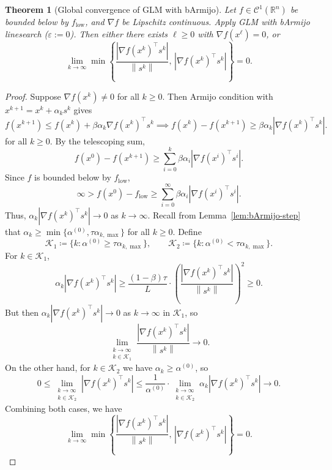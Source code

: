 \documentclass[11pt,a4paper]{report}
\theoremstyle{plain}
\newtheorem{theorem}{Theorem}[chapter]
\theoremstyle{definition}
\newcommand{\R}{\mathbb{R}}
\newcommand{\norm}[1]{\left\lVert#1\right\rVert}
\newcommand{\grad}{\nabla}
\newcommand{\trans}{^{\top}}
\newcommand{\eps}{\varepsilon}
\begin{document}
\begin{theorem}[Global convergence of GLM with bArmijo]\label{thm:GLM-global}
Let $f\in\mathcal{C}^{1}(\R^{n})$ be bounded below by $f_{\mathrm{low}}$, and
$\grad f$ be Lipschitz continuous. Apply GLM with bArmijo linesearch
($\eps:=0$). Then either there exists $\ell\ge 0$ with $\grad f(x^{\ell})=0$,
or
\[
\lim_{k\to\infty}\min\!\left\{\frac{|\grad f(x^{k})\trans s^{k}|}{\norm{s^{k}}},\,
   |\grad f(x^{k})\trans s^{k}|\right\}=0.
\]
\end{theorem}
\begin{proof}
  Suppose $\grad f(x^{k}) \neq 0$ for all $k \geq 0$. Then Armijo condition with $x^{k+1} = x^{k} + \alpha_{k} s^{k}$ gives
  \[
    f(x^{k+1}) \leq f(x^{k}) + \beta \alpha_{k} \grad f(x^{k})\trans s^{k} \implies f(x^{k}) - f(x^{k+1}) \geq \beta \alpha_{k} |\grad f(x^{k})\trans s^{k}|.
  \]
  for all $k \geq 0$. By the telescoping sum,
  \[
    f(x^{0}) - f(x^{k+1}) \geq \sum_{i = 0}^{k} \beta \alpha_{i} |\grad f(x^{i})\trans s^{i}|.
  \]
  Since $f$ is bounded below by $f_{\mathrm{low}}$, 
  \[
    \infty > f(x^{0}) - f_{\mathrm{low}} \geq \sum_{i = 0}^{\infty} \beta \alpha_{i} |\grad f(x^{i})\trans s^{i}|.
  \]
  Thus, $\alpha_{k} |\grad f(x^{k})\trans s^{k}| \to 0$ as $k \to \infty$. Recall from Lemma~\ref{lem:bArmijo-step} that $\alpha_{k} \geq \min\{\alpha^{(0)}, \tau\alpha_{k,\max}\}$ for all $k \geq 0$. Define
  \[
    \mathcal{K}_1 \coloneqq \{k : \alpha^{(0)} \geq \tau\alpha_{k,\max}\}, \qquad \mathcal{K}_2 \coloneqq \{k : \alpha^{(0)} < \tau\alpha_{k,\max}\}.
  \]
  For $k \in \mathcal{K}_1$,
  \[
    \alpha_{k} |\grad f(x^{k})\trans s^{k}| \geq \frac{(1 - \beta)\tau}{L} \cdot \left(\frac{|\grad f(x^{k})\trans s^{k}|}{\norm{s^{k}}}\right)^2 \geq 0.
  \]
  But then $\alpha_{k} |\grad f(x^{k})\trans s^{k}| \to 0$ as $k \to \infty$ in $\mathcal{K}_1$, so
  \[
    \lim_{\substack{k \to \infty \\ k \in \mathcal{K}_1}} \frac{|\grad f(x^{k})\trans s^{k}|}{\norm{s^{k}}} \to 0.
  \]
  On the other hand, for $k \in \mathcal{K}_2$ we have $\alpha_{k} \geq \alpha^{(0)}$, so
  \[
    0 \leq \lim_{\substack{k \to \infty \\ k \in \mathcal{K}_2}} |\grad f(x^{k})\trans s^{k}| \leq \frac{1}{\alpha^{(0)}} \cdot \lim_{\substack{k \to \infty \\ k \in \mathcal{K}_2}} \alpha_{k} |\grad f(x^{k})\trans s^{k}| \to 0.
  \]
  Combining both cases, we have
  \[
    \lim_{k\to\infty}\min\!\left\{\frac{|\grad f(x^{k})\trans s^{k}|}{\norm{s^{k}}},\, |\grad f(x^{k})\trans s^{k}|\right\}=0.
  \]
\end{proof}
\end{document}
